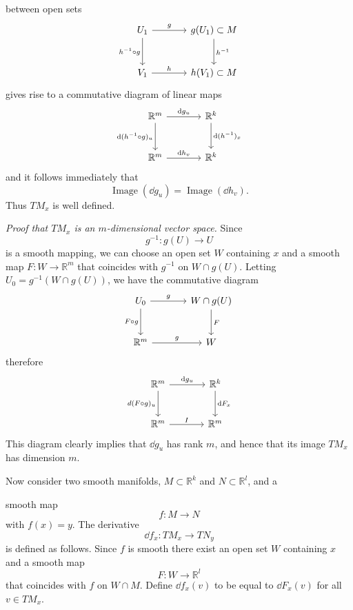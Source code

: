 
between open sets
\[
\begin{tikzcd}[column sep=large, row sep=large]
U_1 \arrow[r, "g"] \arrow[d, "{h^{-1} \circ g}"'] & g(U_1) \subset M \arrow[d, "{h^{-1}}"] \\
V_1 \arrow[r, "h"] & h(V_1) \subset M
\end{tikzcd}
\]
gives rise to a commutative diagram of linear maps
\[
\begin{tikzcd}[column sep=large, row sep=large]
\mathbb{R}^m \arrow[r, "\dd g_u"] \arrow[d, "{\dd(h^{-1} \circ g)_u}"'] & \mathbb{R}^k \arrow[d, "{\dd(h^{-1})_x}"] \\
\mathbb{R}^m \arrow[r, "\dd h_v"] & \mathbb{R}^k
\end{tikzcd}
\]
and it follows immediately that
\[
\operatorname{Image}(\dd g_u) = \operatorname{Image}(\dd h_v).
\]
Thus $TM_x$ is well defined.

\noindent\textit{Proof that $TM_x$ is an $m$-dimensional vector space.}
Since
\[
g^{-1} : g(U) \to U
\]
is a smooth mapping, we can choose an open set $W$ containing $x$ and a smooth map $F : W \to \mathbb{R}^m$ that coincides with $g^{-1}$ on $W \cap g(U)$. Letting $U_0 = g^{-1}(W \cap g(U))$, we have the commutative diagram
\[
\begin{tikzcd}[column sep=large, row sep=large]
U_0 \arrow[r, "g"] \arrow[d, "{F \circ g}"'] & W \cap g(U) \arrow[d, "F"] \\
\mathbb{R}^m \arrow[r, "g"] & W
\end{tikzcd}
\]
therefore
\[
\begin{tikzcd}[column sep=large, row sep=large]
\mathbb{R}^m \arrow[r, "\dd g_u"] \arrow[d, "{d(F \circ g)_u}"'] & \mathbb{R}^k \arrow[d, "\dd F_x"] \\
\mathbb{R}^m \arrow[r, "I"] & \mathbb{R}^m
\end{tikzcd}
\]
This diagram clearly implies that $\dd g_u$ has rank $m$, and hence that its image $TM_x$ has dimension $m$.

Now consider two smooth manifolds, $M \subset \mathbb{R}^k$ and $N \subset \mathbb{R}^l$, and a



smooth map
\[
f: M \to N
\]
with $f(x) = y$. The derivative
\[
\dd f_x : TM_x \to TN_y
\]
is defined as follows. Since $f$ is smooth there exist an open set $W$ containing $x$ and a smooth map
\[
F: W \to \mathbb{R}^l
\]
that coincides with $f$ on $W \cap M$. Define $\dd f_x(v)$ to be equal to $\dd F_x(v)$ for all $v \in TM_x$.

